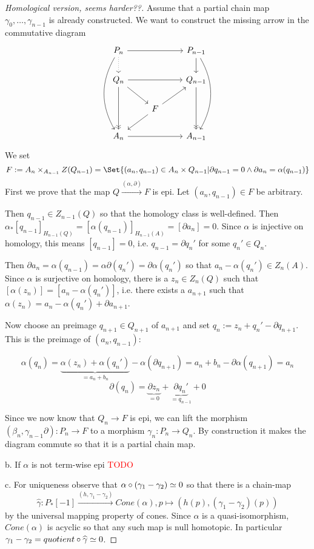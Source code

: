 \documentclass[fontsize=11pt,fleqn,a4paper]{scrartcl}
\begin{document}
\begin{proof}[Homological version, seems harder??]
Assume that a partial chain map $\gamma_0,\ldots,\gamma_{n-1}$ is already constructed. We want to construct the missing arrow in the commutative diagram
\[\begin{tikzcd}
P_n \ar[rr] \ar[d,dotted] \ar[ddd,bend right] && P_{n-1} \ar[d] \ar[ddd,bend left] \\
Q_n \ar[dd,->>] \ar[rr] \ar[rd] && Q_{n-1} \ar[dd,->>] \\
& F \ar[ru] \ar[ld] & \\
A_n \ar[rr] && A_{n-1}
\end{tikzcd}\]
We set
\[F:=A_n \times_{A_{n-1}} Z(Q_{n-1}) = \Set{(a_n,q_{n-1})\in A_n\times Q_{n-1} | \partial q_{n-1} = 0 \wedge \partial a_n = \alpha(q_{n-1})}\]
First we prove that the map $Q \xrightarrow{(\alpha,\partial)} F$ is epi. Let $(a_n,q_{n-1})\in F$ be arbitrary.

Then $q_{n-1} \in Z_{n-1}(Q)$ so that the homology class is well-defined. Then $\alpha_\ast [q_{n-1}]_{H_{n-1}(Q)} = [\alpha(q_{n-1})]_{H_{n-1}(A)} = [\partial a_n] = 0$. Since $\alpha$ is injective on homology, this means $[q_{n-1}] = 0$, i.e. $q_{n-1} = \partial q_n'$ for some $q_n'\in Q_n$.

Then $\partial a_n = \alpha(q_{n-1}) = \alpha\partial(q_n') = \partial \alpha(q_n')$ so that $a_n-\alpha(q_n')\in Z_n(A)$. Since $\alpha$ is surjective on homology, there is a $z_n\in Z_n(Q)$ such that $[\alpha(z_n)] = [a_n-\alpha(q_n')]$, i.e. there exists a $a_{n+1}$ such that $\alpha(z_n) = a_n - \alpha(q_n') + \partial a_{n+1}$.

Now choose an preimage $q_{n+1}\in Q_{n+1}$ of $a_{n+1}$ and set $q_n := z_n+q_n' - \partial q_{n+1}$. This is the preimage of $(a_n,q_{n-1})$:

\[\alpha(q_n) = \underbrace{\alpha(z_n)+\alpha(q_n')}_{=a_n+b_n} - \alpha(\partial q_{n+1}) = a_n + b_n - \partial\alpha(q_{n+1}) = a_n\]
\[\partial(q_n) = \underbrace{\partial z_n}_{=0} + \underbrace{\partial q_n'}_{=q_{n-1}} + 0\]

\medbreak
Since we now know that $Q_n \to F$ is epi, we can lift the morphism $(\beta_n,\gamma_{n-1}\partial): P_n \to F$ to a morphism $\gamma_n: P_n\to Q_n$. By construction it makes the diagram commute so that it is a partial chain map.

\medbreak
b. If $\alpha$ is not term-wise epi \textcolor{red}{TODO}

\medbreak
c. For uniqueness observe that $\alpha\circ(\gamma_1-\gamma_2) \simeq 0$ so that there is a chain-map
\[\widehat{\gamma}: P_\ast[-1] \xrightarrow{(h,\gamma_1-\gamma_2)} Cone(\alpha), p \mapsto (h(p), (\gamma_1-\gamma_2)(p))\]
by the universal mapping property of cones. Since $\alpha$ is a quasi-isomorphism, $Cone(\alpha)$ is acyclic so that any such map is null homotopic. In particular $\gamma_1-\gamma_2 = quotient\circ \widehat{\gamma} \simeq 0$.
\end{proof}
\end{document}
